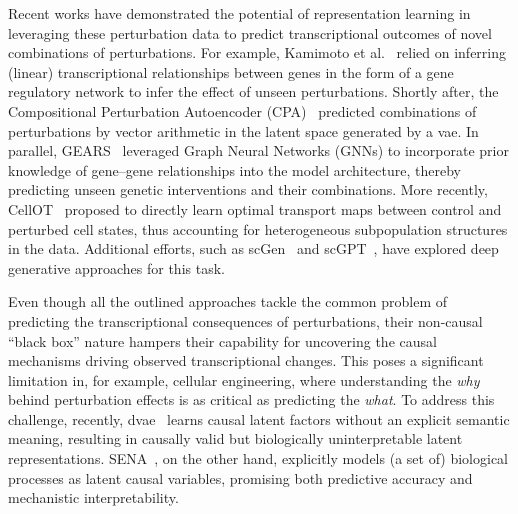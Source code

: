 \documentclass[10pt,letterpaper]{article}
\theoremstyle{definition}
\theoremstyle{remark}
\begin{document}
Recent works have demonstrated the potential of representation learning in leveraging these perturbation data to predict transcriptional outcomes of novel combinations of perturbations. For example, Kamimoto et al.~\cite{kamimoto2023dissecting} relied on inferring (linear) transcriptional relationships between genes in the form of a gene regulatory network to infer the effect of unseen perturbations.
Shortly after, the Compositional Perturbation Autoencoder (CPA)~\cite{lotfollahi_predicting_2023} predicted combinations of perturbations by vector arithmetic in the latent space generated by a \gls{vae}.
In parallel, GEARS~\cite{roohani2024predicting} leveraged Graph Neural Networks (GNNs) to incorporate prior knowledge of gene--gene relationships into the model architecture, thereby predicting unseen genetic interventions and their combinations. More recently, CellOT~\cite{bunne2023learning} proposed to directly learn optimal transport maps between control and perturbed cell states, thus accounting for heterogeneous subpopulation structures in the data.
Additional efforts, such as scGen~\cite{lotfollahi2019scgen} and scGPT~\cite{cui2024scgpt}, have explored deep generative approaches for this task.

Even though all the outlined approaches tackle the common problem of predicting the transcriptional consequences of perturbations, their non-causal ``black box'' nature hampers their capability for uncovering the causal mechanisms driving observed transcriptional changes.
This poses a significant limitation in, for example, cellular engineering, where understanding the \emph{why} behind perturbation effects is as critical as predicting the \emph{what}.
To address this challenge, recently, \gls{dvae}~\cite{zhang2023identifiability} learns causal latent factors without an explicit semantic meaning, resulting in causally valid but biologically uninterpretable latent representations.
SENA~\cite{de2025interpretable}, on the other hand, explicitly models (a set of) biological processes as latent causal variables, promising both predictive accuracy and mechanistic interpretability.
\end{document}
